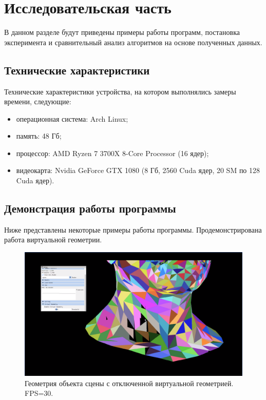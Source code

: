 \chapter{Исследовательская часть}

В данном разделе будут приведены примеры работы программ, постановка эксперимента и сравнительный анализ алгоритмов на основе полученных данных.

\section{Технические характеристики}

Технические характеристики устройства, на котором выполнялись замеры времени, следующие:

\begin{itemize}
	\item операционная система: Arch Linux;
	\item память: 48 Гб;
	\item процессор: AMD Ryzen 7 3700X 8-Core Processor (16 ядер);
	\item видеокарта: Nvidia GeForce GTX 1080 (8 Гб, 2560 Cuda ядер, 20 SM по 128 Cuda ядер).
\end{itemize}

\section{Демонстрация работы программы}

Ниже представлены некоторые примеры работы программы.
Продемонстрирована работа виртуальной геометрии.

\begin{figure}[ph!]
	\centering
	\includegraphics[width=0.95\linewidth]{inc/img/vgeom_off.png}
	\caption{Геометрия объекта сцены с отключенной виртуальной геометрией. FPS=30.}
\end{figure}


